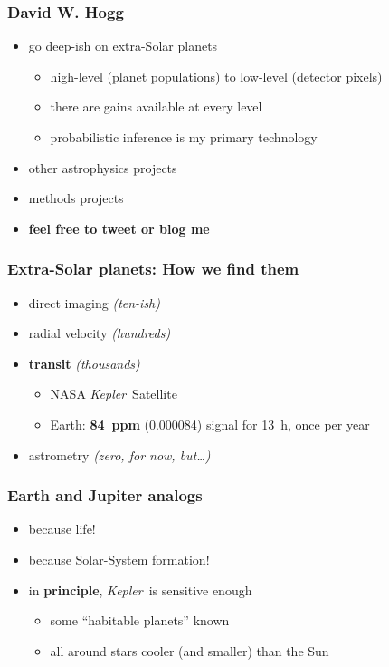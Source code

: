 \documentclass[aspectratio=169]{beamer}
\renewcommand{\emph}[1]{\textbf{#1}}
\newcommand{\project}[1]{\textsl{#1}}
\newcommand{\Kepler}{\project{Kepler}}
\begin{document}
\begin{frame}
  \frametitle{David W. Hogg}
  \begin{itemize}
  \item go deep-ish on extra-Solar planets
    \begin{itemize}
    \item high-level (planet populations) to low-level (detector pixels)
    \item there are gains available at every level
    \item probabilistic inference is my primary technology
    \end{itemize}
  \item other astrophysics projects
  \item methods projects
  \item \emph{feel free to tweet or blog me}
  \end{itemize}
\end{frame}

\begin{frame}
  \frametitle{Extra-Solar planets: How we find them}
  \begin{itemize}
  \item direct imaging \textit{(ten-ish)}
  \item radial velocity \textit{(hundreds)}
  \item \emph{transit} \textit{(thousands)}
    \begin{itemize}
    \item NASA \Kepler\ Satellite
    \item Earth: \emph{84~ppm} (0.000084) signal for 13~h, once per year
    \end{itemize}
  \item astrometry \textit{(zero, for now, but\ldots)}
  \end{itemize}
\end{frame}

\begin{frame}
  \frametitle{Earth and Jupiter analogs}
  \begin{itemize}
  \item because life!
  \item because Solar-System formation!
  \item in \emph{principle}, \Kepler\ is sensitive enough
    \begin{itemize}
    \item some ``habitable planets'' known
    \item all around stars cooler (and smaller) than the Sun
    \end{itemize}
  \end{itemize}
\end{frame}
\end{document}
